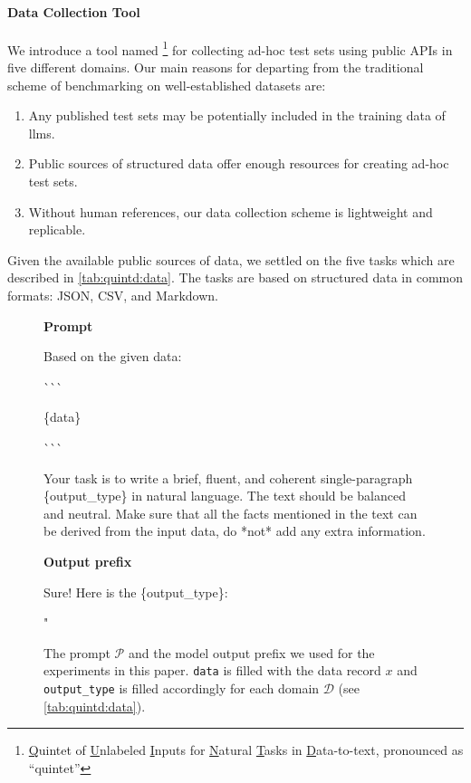 \paragraph{Data Collection Tool}
\label{sec:quintd:data_collection}
We introduce a tool named \datatool\footnote{\underline{Q}uintet of \underline{U}nlabeled \underline{I}nputs for \underline{N}atural \underline{T}asks in \underline{D}ata-to-text, pronounced as ``quintet''} for collecting ad-hoc test sets using public APIs in five different domains.
Our main reasons for departing from the traditional scheme of benchmarking on well-established datasets are:
\begin{enumerate}
    \item Any published test sets may be potentially included in the training data of \acp{llm}.
    \item Public sources of structured data offer enough resources for creating ad-hoc test sets.
    \item Without human references, our data collection scheme is lightweight and replicable.
\end{enumerate}

Given the available public sources of data, we settled on the five tasks which are described in \autoref{tab:quintd:data}. The tasks are based on structured data in common formats: JSON, CSV, and Markdown.


\begin{figure}[t]
    \centering
    \small
    \textbf{Prompt}
    \begin{verbatimbox}
        Based on the given data:

        \`{}\`{}\`{}

        \{data\}

        \`{}\`{}\`{}

        Your task is to write a brief, fluent, and
        coherent single-paragraph \{output\_type\} in natural
        language. The text should be balanced and neutral.
        Make sure that all the facts mentioned in the text
        can be derived from the input data, do *not* add
        any extra information.
    \end{verbatimbox}
    \textbf{Output prefix}
    \begin{verbatimbox}
        Sure! Here is the \{output\_type\}:

        "
    \end{verbatimbox}
    \caption{The prompt $\mathcal{P}$ and the model output prefix we used for the experiments in this paper. \texttt{data} is filled with the data record  $x$ and \texttt{output\_type} is filled accordingly for each domain $\mathcal{D}$ (see \autoref{tab:quintd:data}).}
    \label{fig:quintd:prompt}
\end{figure}


